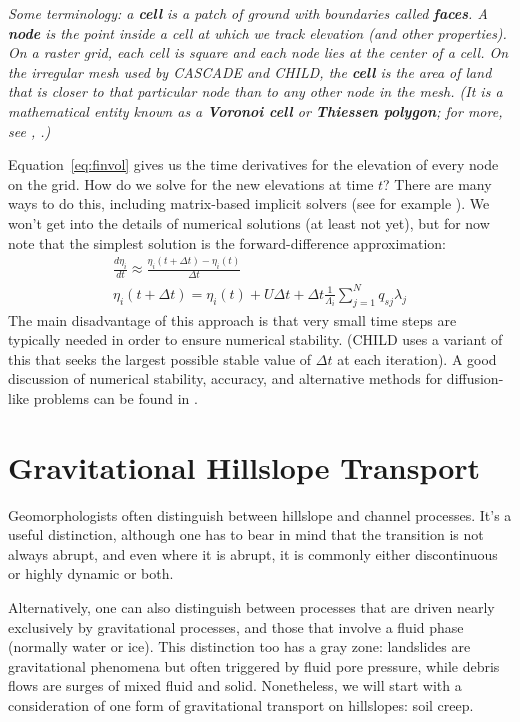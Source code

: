 \documentclass[12pt,reqno]{amsart}
\begin{document}
{\em Some terminology: a {\bf cell} is a patch of ground with boundaries called {\bf faces}. A {\bf node} is the point inside a cell at which we track elevation (and other properties). On a raster grid, each cell is square and each node lies at the center of a cell. On the irregular mesh used by CASCADE and CHILD, the {\bf cell} is the area of land that is closer to that particular node than to any other node in the mesh. (It is a mathematical entity known as a {\bf Voronoi cell} or {\bf Thiessen polygon}; for more, see \citet{braun1997modelling}, \citet{tucker2001object}.)}

Equation~\ref{eq:finvol} gives us the time derivatives for the elevation of every node on the grid. How do we solve for the new elevations at time $t$? There are many ways to do this, including matrix-based implicit solvers (see for example \citet{fagherazzi2002implicit,perron2011numerical}). We won't get into the details of numerical solutions (at least not yet), but for now note that the simplest solution is the forward-difference approximation:
\begin{eqnarray}
\frac{d\eta_i}{dt} \approx \frac{\eta_i(t+\Delta t) - \eta_i(t)}{\Delta t} \\
\eta_i(t+\Delta t) = \eta_i(t) + U\Delta t  + \Delta t \frac{1}{\Lambda_i} \sum_{j=1}^N q_{sj} \lambda_j
\end{eqnarray}
The main disadvantage of this approach is that very small time steps
are typically needed in order to ensure numerical stability. (CHILD
uses a variant of this that seeks the largest possible stable value of $\Delta t$ at each iteration). A good discussion of numerical stability, accuracy, and alternative methods for diffusion-like problems can be found in \citet{press2007numerical}.

\section{Gravitational Hillslope Transport}

Geomorphologists often distinguish between hillslope and channel processes. It's a useful distinction, although one has to bear in mind that the transition is not always abrupt, and even where it is abrupt, it is commonly either discontinuous or highly dynamic or both.

Alternatively, one can also distinguish between processes that are driven nearly exclusively by gravitational processes, and those that involve a fluid phase (normally water or ice). This distinction too has a gray zone: landslides are gravitational phenomena but often triggered by fluid pore pressure, while debris flows are surges of mixed fluid and solid. Nonetheless, we will start with a consideration of one form of gravitational transport on hillslopes: soil creep. 
\end{document}
